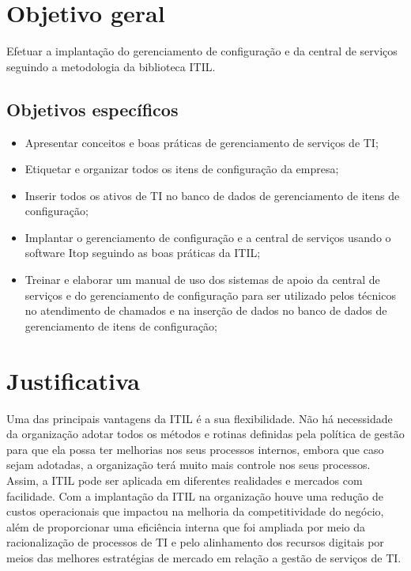 \documentclass[eso]{bcc}
\begin{document}
\section {Objetivo geral}

Efetuar a implantação do gerenciamento de configuração e da central de serviços seguindo a metodologia da biblioteca ITIL.

\subsection{Objetivos específicos}

\begin{itemize}

\item Apresentar conceitos e boas práticas de gerenciamento de serviços de TI;
\item Etiquetar e organizar todos os itens de configuração da empresa;
\item Inserir todos os ativos de TI no banco de dados de gerenciamento de itens de configuração;
\item Implantar o gerenciamento de configuração e a central de serviços  usando o software Itop seguindo as boas práticas da ITIL;
\item Treinar e elaborar um manual de uso dos sistemas de apoio da central de serviços e do gerenciamento de configuração para ser utilizado pelos técnicos no atendimento de chamados e na inserção de dados no banco de dados de gerenciamento de itens de configuração;

\end{itemize}

\section{Justificativa}

Uma das principais vantagens da ITIL é a sua flexibilidade. Não há  necessidade da organização adotar todos os métodos e rotinas definidas pela política de gestão para que ela possa ter melhorias nos seus processos internos, embora que caso sejam adotadas, a organização terá muito mais controle nos seus processos. Assim, a ITIL pode ser aplicada em diferentes realidades e mercados com facilidade. Com a implantação da ITIL na organização houve uma redução de custos operacionais que impactou na melhoria da competitividade do negócio, além de proporcionar uma  eficiência interna que foi ampliada por meio da racionalização de processos de TI e pelo alinhamento dos recursos digitais por meios das melhores estratégias de mercado em relação a gestão de serviços de TI.
\end{document}
